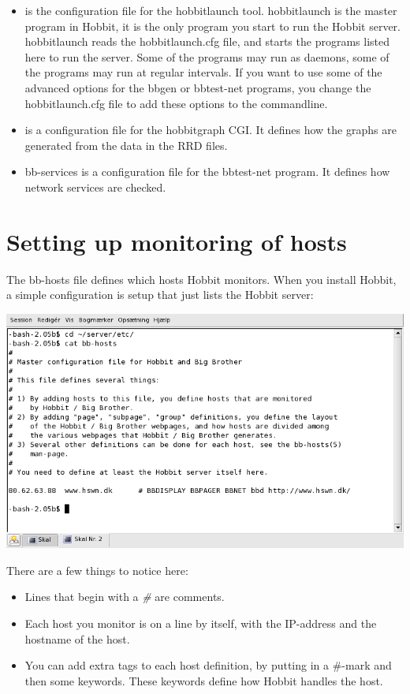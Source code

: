 \begin{itemize}
\item {} is the configuration file for the hobbitlaunch
  tool. hobbitlaunch is the master program in Hobbit, it is the only
  program you start to run the Hobbit server. hobbitlaunch reads the
  hobbitlaunch.cfg file, and starts the programs listed here to run
  the server. Some of the programs may run as daemons, some of the
  programs may run at regular intervals. If you want to use some of
  the advanced options for the bbgen or bbtest-net programs, you
  change the hobbitlaunch.cfg file to add these options to the
  commandline.

\item {} is a configuration file for
  the hobbitgraph  CGI. It defines how the graphs are generated from
  the data in the  RRD files.



\item bb-services is a configuration file for the bbtest-net
  program. It defines how network services are checked.


\end{itemize}

\section{Setting up monitoring of hosts}


 The bb-hosts file defines which hosts Hobbit monitors. When you
 install Hobbit, a simple configuration is setup that just lists the
 Hobbit server: 

\includegraphics[scale=0.5]{./hobbit-bbhosts.png} 


 There are a few things to notice here:
\begin{itemize}
\item Lines that begin with a \emph{\#}
 are comments.
\item Each host you monitor is on a line by itself, with the
  IP-address and the hostname of the host.

\item You can add extra tags to each host definition, by putting in a
  \#-mark and then some keywords. These keywords define how Hobbit
  handles the host.



\end{itemize}



